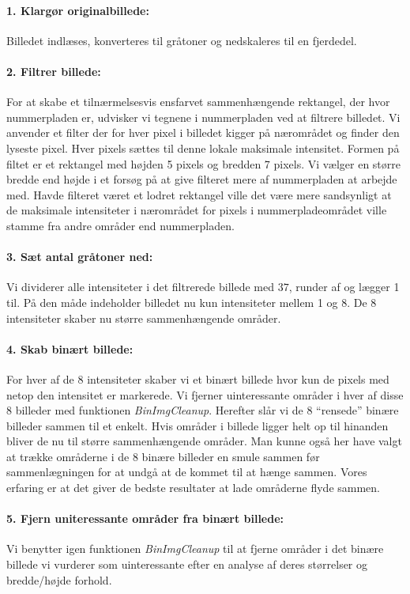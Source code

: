 \paragraph{1. Klargør originalbillede:}
Billedet indlæses, konverteres til gråtoner og nedskaleres til en fjerdedel. 

\paragraph{2. Filtrer billede:}
For at skabe et tilnærmelsesvis ensfarvet sammenhængende rektangel, der hvor nummerpladen er, udvisker vi tegnene i nummerpladen ved at filtrere billedet. Vi anvender et filter der for hver pixel i billedet kigger på nærområdet og finder den lyseste pixel. Hver pixels sættes til denne lokale maksimale intensitet. Formen på filtet er et rektangel med højden 5 pixels og bredden 7 pixels. Vi vælger en større bredde end højde i et forsøg på at give filteret mere af  nummerpladen at arbejde med. Havde filteret været et lodret rektangel ville det være mere sandsynligt at de maksimale intensiteter i nærområdet for pixels i nummerpladeområdet ville stamme fra andre områder end nummerpladen.

\paragraph{3. Sæt antal gråtoner ned:}
Vi dividerer alle intensiteter i det filtrerede billede med $37$, runder af og lægger 1 til. På den måde indeholder billedet nu kun intensiteter mellem 1 og 8. De 8 intensiteter skaber nu større sammenhængende områder.  

\paragraph{4. Skab binært billede:}
For hver af de 8 intensiteter skaber vi et binært billede hvor kun de pixels med netop den intensitet er markerede. Vi fjerner uinteressante områder i hver af disse 8 billeder med funktionen \textit{BinImgCleanup}. Herefter slår vi de 8 ``rensede'' binære billeder sammen til et enkelt. Hvis områder i billede ligger helt op til hinanden bliver de nu til større sammenhængende områder. Man kunne også her have valgt at trække områderne i de 8 binære billeder en smule sammen før sammenlægningen for at undgå at de kommet til at hænge sammen. Vores erfaring er at det giver de bedste resultater at lade områderne flyde sammen.   

\paragraph{5. Fjern uniteressante områder fra binært billede:}
Vi benytter igen funktionen \textit{BinImgCleanup} til at fjerne områder i det binære billede vi vurderer som uinteressante efter en analyse af deres størrelser og bredde/højde forhold.

